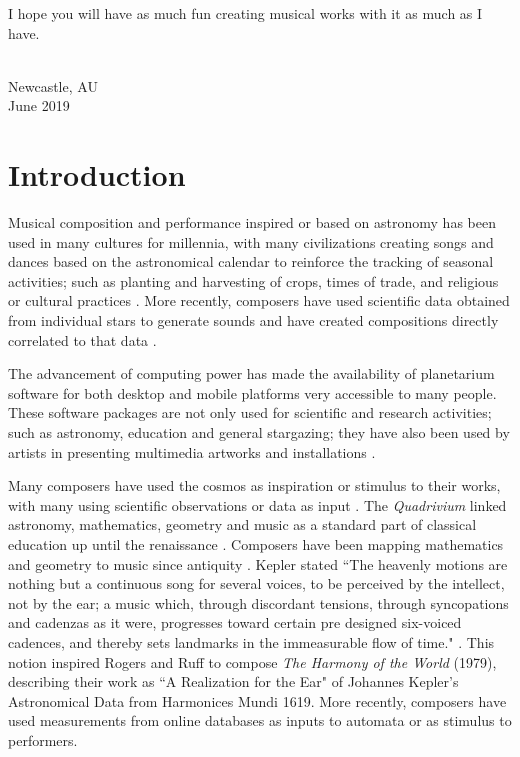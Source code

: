 \documentclass[10pt,a4paper,extrafontsizes]{memoir}
\newcommand\svnidlong[4]{}
\begin{document}
	I hope you will have as much fun creating musical works with it as much as I have.
{ \\ Newcastle, AU \\ June 2019\par}




\svnidlong
{$Ignore: $}
{$LastChangedDate: 2015-04-22 17:17:51 +0200 (Wed, 22 Apr 2015) $}
{$LastChangedRevision: 527 $}
{$LastChangedBy: daleif $}

\chapter{Introduction}
    Musical composition and performance inspired or based on astronomy has been used in many cultures for millennia, with many civilizations creating songs and dances based on the astronomical calendar to reinforce the tracking of seasonal activities; such as planting and harvesting of crops, times of trade, and religious or cultural practices \cite{ruggles2015handbook, deMello2015, Lima2015}.  More recently, composers  have used scientific data obtained from individual stars to generate sounds and have created compositions directly correlated to that data \cite{fraietta2014musical, BriightSyzygy}. 

The advancement of computing power has made the availability of planetarium software for both desktop and mobile platforms very accessible to many people. These software packages are not only used for scientific and research activities; such as astronomy, education and general stargazing; they have also been used by artists in presenting multimedia artworks and installations \cite{zotti2017skyscape,tuveri2013controlling}. 

Many composers have used the cosmos as inspiration or stimulus to their works, with many using scientific observations or data as input \cite{fraknoi2008music, fraietta2014musical}. The \textit{Quadrivium} linked astronomy, mathematics, geometry and music as a standard part of classical education up until the renaissance \cite{lundy2010quadrivium}. Composers have been mapping mathematics and geometry to music since antiquity \cite{james1995music, assayag2002mathematics}. Kepler stated ``The heavenly motions are nothing but a continuous song for several voices, to be perceived by the intellect, not by the ear; a music which, through discordant tensions, through syncopations and cadenzas as it were, progresses toward certain pre designed six-voiced cadences, and thereby sets landmarks in the immeasurable flow of time." \cite[cited in  ~286]{RojersRuffKepler}. This notion inspired Rogers and Ruff to compose \textit{The Harmony of the World} (1979), describing their work as ``A Realization for the Ear" \cite [p. 286]{RojersRuffKepler} of Johannes Kepler's Astronomical Data from Harmonices Mundi 1619.
More recently, composers have used measurements from online databases as inputs to automata or as stimulus to performers. 
\end{document}
